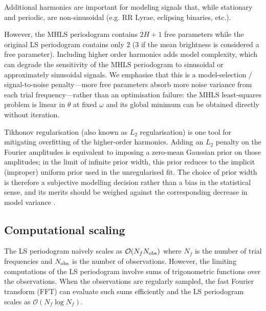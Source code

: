 \documentclass[apj]{emulateapj}
\newcommand{\bigO}{\mathcal{O}}
\begin{document}
Additional harmonics are important for modeling signals that, while stationary and periodic,
are non-sinusoidal (e.g. RR Lyrae, eclipsing binaries, etc.).

However, the MHLS periodogram contains $2H+1$ free parameters while the original LS periodogram
contains only $2$ ($3$ if the mean brightness is considered a free parameter). Including higher order
harmonics adds model complexity, which can degrade the sensitivity of the MHLS periodogram to
sinusoidal or approximately sinusoidal signals. We emphasise that this is a model-selection / signal-to-noise
penalty---more free parameters absorb more noise variance from each trial frequency---rather than an optimisation
failure: the MHLS least-squares problem is linear in $\theta$ at fixed $\omega$ and its global minimum can
be obtained directly without iteration.

Tikhonov regularisation (also known as $L_2$ regularisation) is one tool for
mitigating overfitting of the higher-order harmonics. Adding an $L_2$ penalty
on the Fourier amplitudes is equivalent to imposing a zero-mean Gaussian prior
on those amplitudes; in the limit of infinite prior width, this prior reduces
to the implicit (improper) uniform prior used in the unregularised fit. The
choice of prior width is therefore a subjective modelling decision rather than
a bias in the statistical sense, and its merits should be weighed against the
corresponding decrease in model variance \citep{Vanderplas+Ivezic_2015}.

\subsection{Computational scaling}

The LS periodogram naively scales as $\bigO(N_f N_{\rm obs})$ where $N_f$ is the number of trial
frequencies and $N_{\rm obs}$ is the number of observations. However, the limiting computations
of the LS periodogram involve sums of trigonometric functions over the observations. When
the observations are regularly sampled, the fast Fourier transform (FFT)  \citep{Cooley+Tukey_1965}
can evaluate such sums efficiently and the LS periodogram scales as $\bigO(N_f\log N_f)$.
\end{document}
